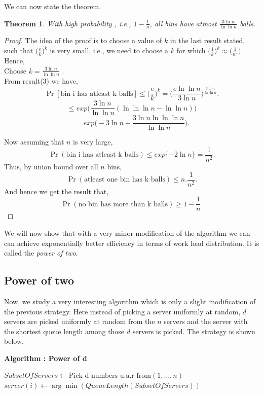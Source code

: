 \documentclass[a4paper,english,11pt]{article}
\newtheorem{theorem}{Theorem}
\begin{document}
We can now state the theorem.
\begin{theorem}
With high probability , i.e., $1-\frac{1}{n}$, all bins have atmost $\frac{3\ln n}{\ln \ln n}$ balls. 
\end{theorem}
\begin{proof}
The idea of the proof is to choose a value of $k$ in the last result stated, such  that $\Big(\frac{e}{k}\Big)^k$ is very small, i.e., we need to choose a $k$ for which $\Big(\frac{1}{k}\Big)^k \approx \Big(\frac{1}{n^2}\Big)$. Hence,\\
Choose $k = \frac{3\ln n}{\ln \ln n}$ .\\
From result(3) we have,
\[\Pr[\text{bin i has atleast k balls}] \leq \Big(\frac{e}{k}\Big)^k =  \Big( \frac{e\ln \ln n}{3 \ln n}\Big)^{\frac{3 \ln n}{\ln \ln n}}.\]
\[\leq exp \Big(\frac{3 \ln n}{\ln \ln n}(\ln \ln \ln n - \ln \ln n)\Big)\]
\[= exp\Big(-3 \ln n + \frac{3 \ln n \ln \ln \ln n}{\ln \ln n}\Big).\]

Now assuming that $n$ is very large,
\[\Pr(\text{bin i has atleast k balls}) \leq exp\{-2\ln n\} = \frac{1}{n^2}.\]
Thus, by union bound over all $n$ bins,
\[\Pr(\text{atleast one bin has k balls}) \leq n.\frac{1}{n^2}.\]
And hence we get the result that,
\[\Pr(\text{no bin has more than k balls}) \geq 1-\frac{1}{n}.\]
\end{proof}
We will now show that with a very minor modification of the algorithm we can can achieve exponentially better efficiency in terms of work load distribution. It is called the \textit{power of two}.
\subsection{Power of two}

Now, we study a very interesting algorithm which is only  a slight modification of the previous strategy. Here instead of picking a server uniformly at random, $d$ servers are picked uniformly at random from the $n$ servers and the server with the shortest queue length among those $d$ servers is picked. The strategy is shown below. 
\begin{algorithm}
\textbf{{Algorithm : Power of d}}\label{euclid2}
\begin{algorithmic}[1]
\State ${SubsetOfServers \gets \text{Pick d numbers u.a.r from} (1,\ldots,n)}$
\State $server(i) \gets \arg\min(QueueLength(SubsetOfServers))$
\EndFor
\State \Return 
\end{algorithmic}
\end{algorithm}
\end{document}

